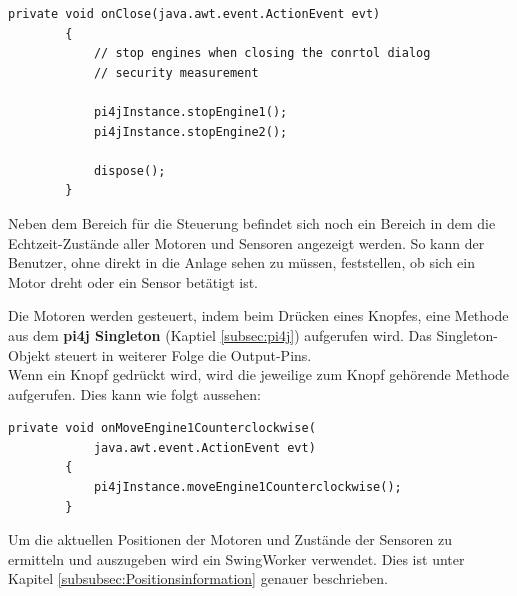 \newpage

\begin{lstlisting}[style=JavaStyle, caption=Motoren stoppen und Fenster schließen]
	private void onClose(java.awt.event.ActionEvent evt)                                
    	{                                 
       		// stop engines when closing the conrtol dialog
       		// security measurement
       		
        	pi4jInstance.stopEngine1();
        	pi4jInstance.stopEngine2();
        
        	dispose();
    	} 
\end{lstlisting}

\vspace{10pt}

Neben dem Bereich für die Steuerung befindet sich noch ein Bereich in dem die Echtzeit-Zustände aller Motoren und Sensoren angezeigt werden. So kann der Benutzer, ohne direkt in die Anlage sehen zu müssen, feststellen, ob sich ein Motor dreht oder ein Sensor betätigt ist.

\vspace{10pt}

Die Motoren werden gesteuert, indem beim Drücken eines Knopfes, eine Methode aus dem \textbf{\ac{pi4j} Singleton} (Kaptiel \ref{subsec:pi4j}) aufgerufen wird. Das Singleton-Objekt steuert in weiterer Folge die Output-Pins.
\\ Wenn ein Knopf gedrückt wird, wird die jeweilige zum Knopf gehörende Methode aufgerufen. Dies kann wie folgt aussehen:
\begin{lstlisting}[style=JavaStyle, caption=Motoren drehen] 
	private void onMoveEngine1Counterclockwise(
			java.awt.event.ActionEvent evt)                                               
    	{                                                   
        	pi4jInstance.moveEngine1Counterclockwise();
    	}  
\end{lstlisting}

\vspace{10pt}

Um die aktuellen Positionen der Motoren und Zustände der Sensoren zu ermitteln und auszugeben wird ein SwingWorker verwendet. Dies ist unter Kapitel \ref{subsubsec:Positionsinformation} genauer beschrieben.

\newpage


